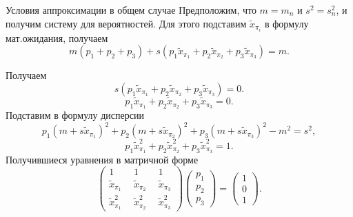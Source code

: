 \documentclass[ucs, notheorems, handout]{beamer}
\begin{document}
\begin{frame}{Условия аппроксимации в общем случае}
	Предположим, что $m=m_{n}$ и $s^{2} = s_{n}^{2}$, и получим систему для  вероятностей.
	Для этого подставим $\tilde{x}_{\pi_{i}}$ в формулу мат.ожидания, получаем
	\begin{equation*}
		m(p_{1} + p_{2} + p_{3})+s(p_{1}\tilde{x}_{\pi_1}+p_{2}\tilde{x}_{\pi_{2}}+p_{3}\tilde{x}_{\pi_{3}})=m.
	\end{equation*}
	
	Получаем
	\begin{equation*}
		s(p_{1}\tilde{x}_{\pi_1}+p_{2}\tilde{x}_{\pi_{2}}+p_{3}\tilde{x}_{\pi_{3}})=0.
	\end{equation*}
	\begin{equation*}
		p_{1}\tilde{x}_{\pi_1}+p_{2}\tilde{x}_{\pi_{2}}+p_{3}\tilde{x}_{\pi_{3}}=0.
	\end{equation*}
	Подставим в формулу дисперсии
	\begin{equation*}
		p_{1}(m+s\tilde{x}_{\pi_{1}})^{2}+p_{2}(m+s\tilde{x}_{\pi_{2}})^{2}+p_{3}(m+s\tilde{x}_{\pi_{3}})^{2} - m^{2} = s^{2},
	\end{equation*}
	\begin{equation*}
		p_{1}\tilde{x}_{\pi_{1}}^{2}+p_{2}\tilde{x}_{\pi_{2}}^{2}+p_{3}\tilde{x}_{\pi_{3}}^{2} = 1.
	\end{equation*}
	Получившиеся уравнения в матричной форме
	\begin{equation*}
		\begin{pmatrix} 
			1&1&1\\ 
			\tilde{x}_{\pi_{1}}~~ &  \tilde{x}_{\pi_{2}}~~  & \tilde{x}_{\pi_{3}} \\ 
			\tilde{x}_{\pi_{1}}^{2}~~&\tilde{x}_{\pi_{2}}^{2}~~  &\tilde{x}_{\pi_{3}}^{2}
		\end{pmatrix}
		\begin{pmatrix}p_{1}\\p_{2}\\ p_{3}\end{pmatrix}= \begin{pmatrix}1\\0\\1 \end{pmatrix}. \label{6}
	\end{equation*}
\end{frame}
	
\end{document}
